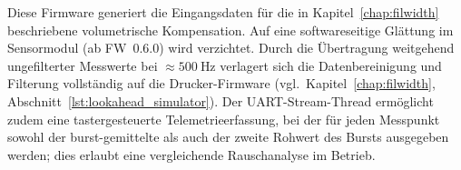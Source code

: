Diese Firmware generiert die Eingangsdaten für die in Kapitel~\ref{chap:filwidth} beschriebene volumetrische Kompensation.
Auf eine softwareseitige Glättung im Sensormodul (ab FW~0.6.0) wird verzichtet. Durch die Übertragung weitgehend ungefilterter Messwerte bei $\approx \qty{500}{\hertz}$ verlagert sich die Datenbereinigung und Filterung vollständig auf die Drucker-Firmware (vgl.\ Kapitel~\ref{chap:filwidth}, Abschnitt~\ref{lst:lookahead_simulator}).
Der UART-Stream-Thread ermöglicht zudem eine tastergesteuerte Telemetrieerfassung, bei der für jeden Messpunkt sowohl der burst-gemittelte als auch der zweite Rohwert des Bursts ausgegeben werden; dies erlaubt eine vergleichende Rauschanalyse im Betrieb.

